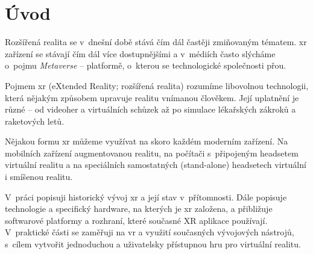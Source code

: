 \chapter*{Úvod}
Rozšířená realita se v~dnešní době stává čím dál častěji zmiňovaným tématem. \gls{xr} zařízení se stávají čím dál více dostupnějšími a v~médiích často slýcháme o~pojmu \textit{Metaverse} -- platformě, o~kterou se technologické společnosti přou.

Pojmem \gls{xr} (eXtended Reality; rozšířená realita) rozumíme libovolnou technologii, která nějakým způsobem upravuje realitu vnímanou člověkem. Její uplatnění je různé -- od videoher a virtuálních schůzek až po simulace lékařských zákroků a raketových letů. \cite{muni_kybernetika}

Nějakou formu \gls{xr} můžeme využívat na skoro každém moderním zařízení. Na mobilních zařízení augmentovanou realitu, na počítači s~připojeným headsetem virtuální realitu a na speciálních samostatných (stand-alone) headsetech virtuální i smíšenou realitu.

V~práci popisuji historický vývoj \gls{xr} a její stav v~přítomnosti. Dále popisuje technologie a specifický hardware, na kterých je \gls{xr} založena, a přibližuje softwarové platformy a rozhraní, které současné XR aplikace používají. V~praktické části se zaměřuji na \gls{vr} a využití současných vývojových nástrojů, s~cílem vytvořit jednoduchou a uživatelsky přístupnou hru pro virtuální realitu.